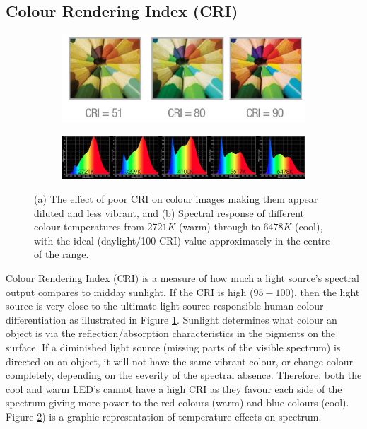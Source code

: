 \documentclass[fleqn,twoside,12pt]{report}
\begin{document}
\subsection{Colour Rendering Index (CRI)}

\begin{figure}[h]
	\centering
	\begin{subfigure}{\textwidth}
		\centering
		\includegraphics[width=0.8\linewidth]{cri.jpg}
		\caption{}
		\label{fig:cri}
	\end{subfigure}%

	\begin{subfigure}{\textwidth}
		\centering
		\includegraphics[width=\linewidth]{temp_response.jpg}
		\caption{}
		\label{fig:temp_response}
	\end{subfigure}%
	\caption{(a) The effect of poor CRI on colour images making them appear diluted and less vibrant, and (b) Spectral response of different colour temperatures from $2721K$ (warm) through to $6478K$ (cool), with the ideal (daylight/100 CRI) value approximately in the centre of the range.}
	\label{}
\end{figure}


Colour Rendering Index (CRI) is a measure of how much a light source's spectral output compares to midday sunlight. If the CRI is high ($95-100$), then the light source is very close to the ultimate light source responsible human colour differentiation as illustrated in Figure \ref{fig:cri}. Sunlight determines what colour an object is via the reflection/absorption characteristics in the pigments on the surface. If a diminished light source (missing parts of the visible spectrum) is directed on an object, it will not have the same vibrant colour, or change colour completely, depending on the severity of the spectral absence. Therefore, both the cool and warm LED's cannot have a high CRI as they favour each side of the spectrum giving more power to the red colours (warm) and blue colours (cool). Figure \ref{fig:temp_response}) is a graphic representation of temperature effects on spectrum.
\end{document}
